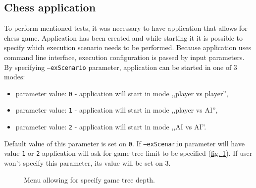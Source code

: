\subsection{Chess application}
To perform mentioned tests, it was necessary to have application that allows for chess game. Application has been created and while starting it it is possible to specify which execution scenario needs to be performed. Because application uses command line interface, execution configuration is passed by input parameters. By specifying \texttt{--exScenario} parameter, application can be started in one of 3 modes:
\begin{itemize}
    \item parameter value: \texttt{0} - application will start in mode ,,player vs player'',
    \item parameter value: \texttt{1} - application will start in mode ,,player vs AI'',
    \item parameter value: \texttt{2} - application will start in mode ,,AI vs AI''.
\end{itemize}
Default value of this parameter is set on \texttt{0}. If \texttt{--exScenario} parameter will have value \texttt{1} or \texttt{2} application will ask for game tree limit to be specified (\hyperref[fig:setting-game-tree-depth]{fig. \ref*{fig:setting-game-tree-depth}}). If user won't specify this parameter, its value will be set on $3$.
\begin{figure}
    \centering
    \caption{Menu allowing for specify game tree depth.}
    \label{fig:setting-game-tree-depth}
\end{figure}

